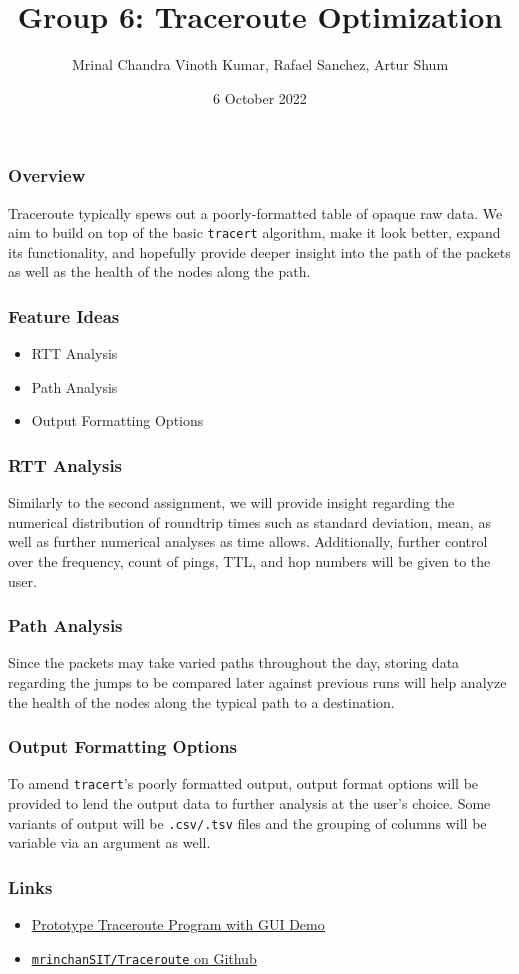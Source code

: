 \documentclass{beamer}
\title{Group 6: Traceroute Optimization}
\author{Mrinal Chandra Vinoth Kumar, Rafael Sanchez, Artur Shum}
\institute{Stevens Institute of Technology}
\date{6 October 2022}
\begin{document}
\frame{\titlepage}

\begin{frame}
\frametitle{Overview}

Traceroute typically spews out a poorly-formatted table of 
opaque raw data. We aim to build on top of the basic \texttt{tracert} algorithm,
make it look better, expand its functionality, and hopefully provide deeper insight
into the path of the packets as well as the health of the nodes along the path.

\end{frame}

\begin{frame}
\frametitle{Feature Ideas}
\begin{itemize}
  \item RTT Analysis
  \item Path Analysis
  \item Output Formatting Options
\end{itemize}
\end{frame}

\begin{frame}
\frametitle{RTT Analysis}

Similarly to the second assignment, we will provide insight regarding
the numerical distribution of roundtrip times such as standard deviation,
mean, as well as further numerical analyses as time allows. Additionally,
further control over the frequency, count of pings, TTL, and hop numbers
will be given to the user.

\end{frame}

\begin{frame}
\frametitle{Path Analysis}

Since the packets may take varied paths throughout the day, storing data regarding
the jumps to be compared later against previous runs will help analyze the health
of the nodes along the typical path to a destination. 

\end{frame}

\begin{frame}

\frametitle{Output Formatting Options}

To amend \texttt{tracert}'s poorly formatted output, output format options 
will be provided to lend the output data to further analysis at the user's choice.
Some variants of output will be \texttt{.csv/.tsv} files and the 
grouping of columns will be variable via an argument as well.

\end{frame}

\begin{frame}
  \frametitle{Links}

  \begin{itemize}
  \item \href{http://youtu.be/Z2_QqqkHR54}{\underline{Prototype Traceroute Program with GUI Demo}}
  \item \href{http://github.com/mrinchanSIT/Traceroute}{\underline{\texttt{mrinchanSIT/Traceroute} on Github}}
  \end{itemize}
\end{frame}
\end{document}
